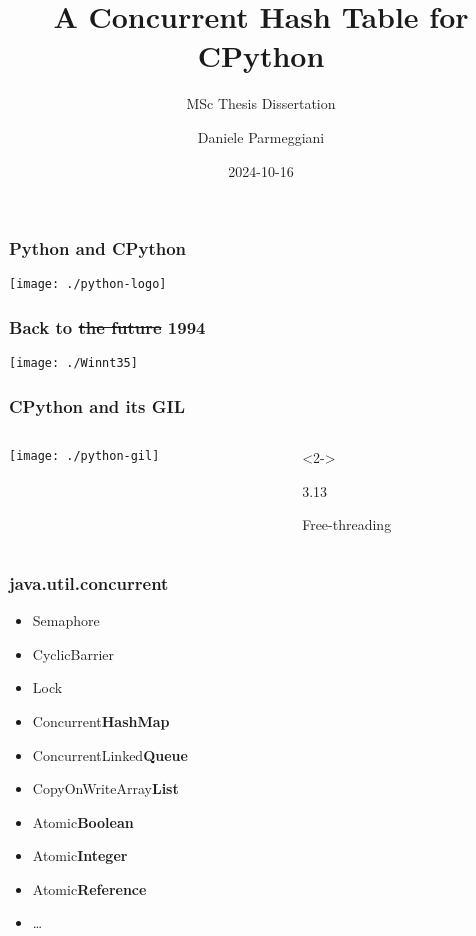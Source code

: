 \documentclass[aspectratio=169]{beamer}
\title{A Concurrent Hash Table for CPython}
\subtitle{MSc Thesis Dissertation}
\date{2024-10-16}
\institute{Università degli Studi di Trento, DISI}
\author{Daniele Parmeggiani}
\begin{document}

\inserttitleframe


\begin{frame}
    \frametitle{Python and CPython}
    \begin{center}
        \texttt{[image: ./python-logo]}
    \end{center}
\end{frame}

\begin{frame}
    \frametitle{Back to \sout{the future} 1994}
    \begin{center}
        \texttt{[image: ./Winnt35]}
    \end{center}
\end{frame}

\begin{frame}
    \frametitle{CPython and its GIL}

    \begin{columns}
        \begin{column}{0.5\textwidth}
            \centering\texttt{[image: ./python-gil]}
        \end{column}
        \begin{column}{0.5\textwidth}<2->
            \begin{center}
                \Huge{3.13}

                \Large{Free-threading}
            \end{center}
        \end{column}
    \end{columns}
\end{frame}

\begin{frame}
    \frametitle{java.util.concurrent}

    \begin{itemize}
        \item Semaphore \checked
        \item CyclicBarrier \checked
        \item Lock \checked
        \item Concurrent{\textbf{HashMap}}
        \item ConcurrentLinked{\textbf{Queue}}
        \item CopyOnWriteArray{\textbf{List}}
        \item Atomic{\textbf{Boolean}}
        \item Atomic{\textbf{Integer}}
        \item Atomic{\textbf{Reference}}
        \item \ldots
    \end{itemize}
\end{frame}
\end{document}
